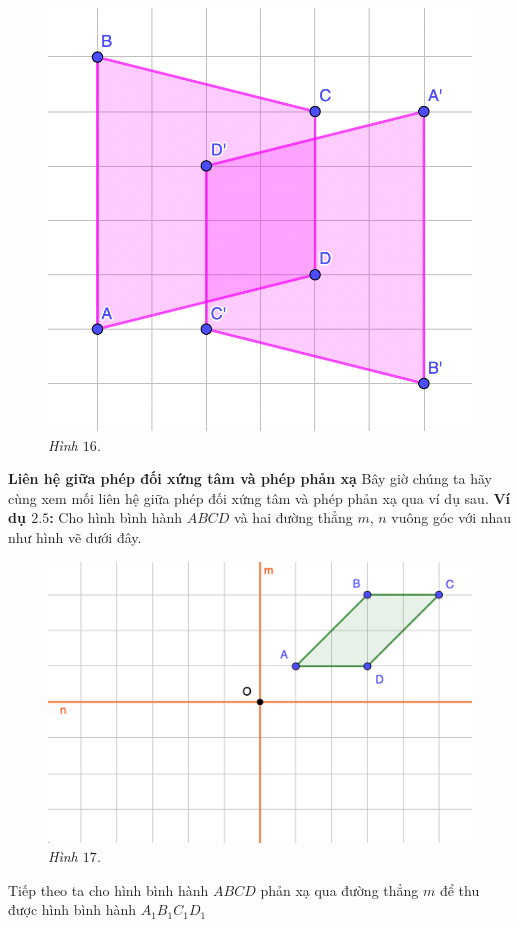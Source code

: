 \begin{multicols}{2}
\begin{figure}[H]
		\includegraphics[width= 0.64\linewidth]{16}
		\caption{\small\textit{\color{toancuabi}Hình $16$.}}
		\vspace*{-10pt}
	\end{figure}
	\textbf{\color{toancuabi}Liên hệ giữa phép đối xứng tâm và phép phản xạ}
	\vskip 0.1cm
	Bây giờ chúng ta hãy cùng xem mối liên hệ giữa phép đối xứng tâm và phép phản xạ qua ví dụ sau.
	\vskip 0.1cm
	\textbf{\color{toancuabi}Ví dụ $\pmb{2.5}$:} Cho hình bình hành $ABCD$ và hai đường thẳng $m$, $n$ vuông góc với nhau như hình vẽ dưới đây.
	\begin{figure}[H]
		\vspace*{-5pt}
		\centering
		\captionsetup{labelformat= empty, justification=centering}
		\includegraphics[width= 1\linewidth]{17}
		\caption{\small\textit{\color{toancuabi}Hình $17$.}}
		\vspace*{-5pt}
	\end{figure}
	Tiếp theo ta cho hình bình hành $ABCD$ phản xạ qua đường thẳng $m$ để thu được hình bình hành $A_1B_1C_1D_1$

\end{multicols}
